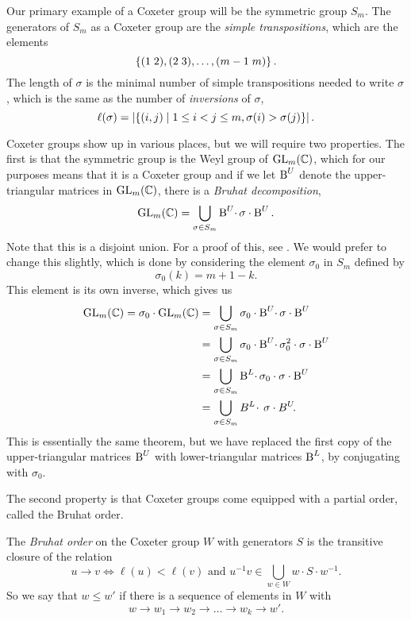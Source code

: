 Our primary example of a Coxeter group will be the
symmetric group $S_m$.
The generators of $S_m$ as a Coxeter group are the \textit{simple
  transpositions}, which are the elements
\[ \left\{ (1\; 2), (2\; 3), \dots, (m-1 \; m)  \right\}. \]
The length of $\sigma$ is the minimal number of simple transpositions
needed to write $\sigma$, which is the same as the number of
\textit{inversions} of $\sigma$,
\[ \ell(\sigma) = \left| \left\{  (i,j) \mid 1\leq i < j\leq m, \sigma(i) >
  \sigma(j) \right\} \right|. \]

Coxeter groups show up in various places, but we will require two
properties. The first is that the symmetric group is the Weyl group of
$\operatorname{GL}_m(\mathbb{C})$, which for our purposes means that it is a Coxeter group
and if we let $\operatorname{B}^U$ denote the upper-triangular matrices in
$\operatorname{GL}_m(\mathbb{C})$, there is a \textit{Bruhat decomposition},
\[ \operatorname{GL}_m(\mathbb{C}) = \bigcup_{\sigma \in S_m} \operatorname{B}^U \!\cdot\, \sigma \cdot \operatorname{B}^U. \]
Note that this is a disjoint union. For a proof of this, see
\cite[Theorem 4.3]{hiller}. We
would prefer to change this slightly, which is done by considering the
element $\sigma_0$ in $S_m$ defined by
\[ \sigma_0(k) = m+1-k. \]
This element is its own inverse, which gives us
\begin{align*}
  \operatorname{GL}_m(\mathbb{C}) = \sigma_0 \cdot \operatorname{GL}_m(\mathbb{C}) &= \bigcup_{\sigma\in S_m}
                                         \sigma_0\cdot \operatorname{B}^U \!\cdot\,
                                         \sigma\cdot \operatorname{B}^U \\
                                       &= \bigcup_{\sigma\in S_m}
                                         \sigma_0\cdot \operatorname{B}^U \!\cdot\,
                                         \sigma_0^2\cdot \sigma \cdot
                                         \operatorname{B}^U \\
                                       &= \bigcup_{\sigma\in S_m}
                                         \operatorname{B}^L\!\cdot\, \sigma_0\cdot
                                         \sigma\cdot \operatorname{B}^U \\
                                       &= \bigcup_{\sigma\in S_m}
                                         B^L\!\cdot\,\sigma\cdot
                                         B^U\!.
\end{align*}
This is essentially the same theorem, but we have replaced the first
copy of the upper-triangular matrices $\operatorname{B}^U$ with lower-triangular
matrices $\operatorname{B}^L$, by
conjugating with $\sigma_0$.

The second property is that Coxeter groups come equipped with a
partial order, called the Bruhat order.
\begin{definition}
  \label{def:bruhat-def}
  The \textit{Bruhat order} on the Coxeter group $W$ with generators
  $S$ is the transitive closure of the relation
  \[ u \to v \iff \ell(u) < \ell(v) \text{ and } u^{-1}v \in
  \bigcup_{w\in W} w
  \cdot S \cdot w^{-1}. \]
  So we say that $w \leq w'$ if there is a sequence of elements in $W$
  with
  \[ w \to w_1 \to w_2 \to \dots \to w_k \to w'. \]
\end{definition}

